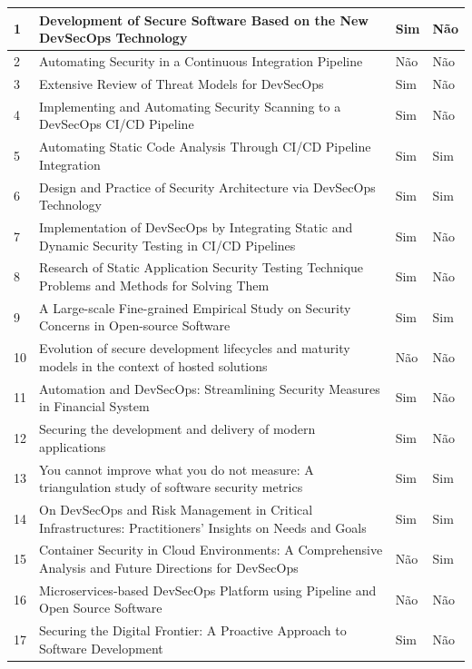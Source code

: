 \begin{longtable}{|p{1cm}|p{8cm}|p{3.5cm}|p{3cm}|}
    1 & Development of Secure Software Based on the New DevSecOps Technology & Sim & Não \\
    \hline
    2 & Automating Security in a Continuous Integration Pipeline & Não & Não \\
    \hline
    3 & Extensive Review of Threat Models for DevSecOps & Sim & Não \\
    \hline
    4 & Implementing and Automating Security Scanning to a DevSecOps CI/CD Pipeline & Sim & Não \\
    \hline
    5 & Automating Static Code Analysis Through CI/CD Pipeline Integration & Sim & Sim \\
    \hline
    6 & Design and Practice of Security Architecture via DevSecOps Technology & Sim & Sim \\
    \hline
    7 & Implementation of DevSecOps by Integrating Static and Dynamic Security Testing in CI/CD Pipelines & Sim & Não \\
    \hline
    8 & Research of Static Application Security Testing Technique Problems and Methods for Solving Them & Sim & Não \\
    \hline
    9 & A Large-scale Fine-grained Empirical Study on Security Concerns in Open-source Software & Sim & Sim \\
    \hline
    10 & Evolution of secure development lifecycles and maturity models in the context of hosted solutions & Não & Não \\
    \hline
    11 & Automation and DevSecOps: Streamlining Security Measures in Financial System & Sim & Não \\
    \hline
    12 & Securing the development and delivery of modern applications & Sim & Não \\
    \hline
    13 & You cannot improve what you do not measure: A triangulation study of software security metrics & Sim & Sim \\
    \hline
    14 & On DevSecOps and Risk Management in Critical Infrastructures: Practitioners' Insights on Needs and Goals & Sim & Sim \\
    \hline
    15 & Container Security in Cloud Environments: A Comprehensive Analysis and Future Directions for DevSecOps & Não & Sim \\
    \hline
    16 & Microservices-based DevSecOps Platform using Pipeline and Open Source Software & Não & Não \\
    \hline
    17 & Securing the Digital Frontier: A Proactive Approach to Software Development & Sim & Não \\

\end{longtable}
